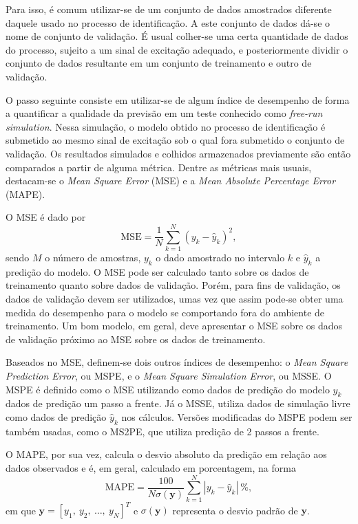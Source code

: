 Para  isso, é comum utilizar-se de um conjunto de dados amostrados diferente daquele usado no processo de identificação. A este conjunto de dados dá-se o nome de conjunto de validação. É usual colher-se uma certa quantidade de dados do processo, sujeito a um sinal de excitação adequado, e posteriormente dividir o conjunto de dados resultante em um conjunto de treinamento e outro de validação.

O passo seguinte consiste em utilizar-se de algum índice de desempenho de forma a quantificar a qualidade da previsão em um teste conhecido como \textit{free-run simulation}. Nessa simulação, o modelo obtido no processo de identificação é submetido ao mesmo sinal de excitação sob o qual fora submetido o conjunto de validação. Os resultados simulados e colhidos armazenados previamente são então comparados a partir de alguma métrica. Dentre as métricas mais usuais, destacam-se o \textit{Mean Square Error} (MSE) e a \textit{Mean Absolute Percentage Error} (MAPE).

O MSE é dado por
\begin{equation}
   \label{eq:MSE}
   \text{MSE} = \frac{1}{N}\sum_{k=1}^{N}(y_k-\hat{y}_k)^2,
\end{equation}
sendo $M$ o número de amostras, $y_k$ o dado amostrado no intervalo $k$ e $\hat{y}_k$ a predição do modelo. O MSE pode ser calculado tanto sobre os dados de treinamento quanto sobre dados de validação. Porém, para fins de validação, os dados de validação devem ser utilizados, umas vez que assim pode-se obter uma medida do desempenho para o modelo se comportando fora do ambiente de treinamento. Um bom modelo, em geral, deve apresentar o MSE sobre os dados de validação próximo ao MSE sobre os dados de treinamento. 

Baseados no MSE, definem-se dois outros índices de desempenho: o \textit{Mean Square Prediction Error}, ou MSPE, e o \textit{Mean Square Simulation Error}, ou MSSE.
O MSPE é definido como o MSE utilizando como dados de predição do modelo $\hat{y}_k$ dados de predição um passo a frente. Já o MSSE, utiliza dados de simulação livre como dados de predição $\hat{y}_k$ nos cálculos. Versões modificadas do MSPE podem ser também usadas, como o MS2PE, que utiliza predição de 2 passos a frente.

O MAPE, por sua vez, calcula o desvio absoluto da predição em relação aos dados observados e é, em geral, calculado em porcentagem, na forma
\begin{equation}
   \label{eq:MAPE}
   \text{MAPE} =  \frac{100}{N{\sigma(\bm{y})}}\sum_{k=1}^{N} {|y_k - \hat{y}_k|}\ \%, %
\end{equation}
em que $\bm{y}=[y_1,\ y_2,\ \dots,\ y_N]^T$ e $\sigma(\bm{y})$ representa o desvio padrão de $\bm{y}$. 

